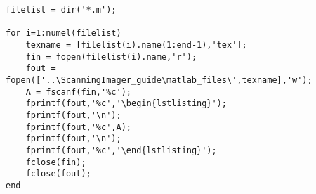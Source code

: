 \begin{lstlisting}
filelist = dir('*.m');

for i=1:numel(filelist)
    texname = [filelist(i).name(1:end-1),'tex'];
    fin = fopen(filelist(i).name,'r');
    fout = fopen(['..\ScanningImager_guide\matlab_files\',texname],'w');
    A = fscanf(fin,'%c');
    fprintf(fout,'%c','\begin{lstlisting}');
    fprintf(fout,'\n');
    fprintf(fout,'%c',A);
    fprintf(fout,'\n');
    fprintf(fout,'%c','\end{lstlisting}');
    fclose(fin);
    fclose(fout);
end
\end{lstlisting}